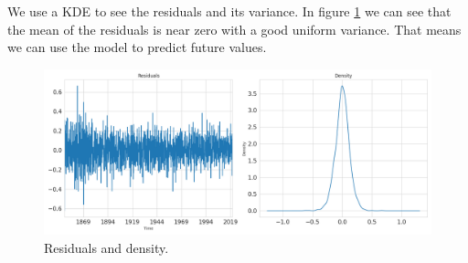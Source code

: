 \documentclass[]{article}
\begin{document}
\begin{itemize}
		We use a KDE to see the residuals and its variance. In figure \ref{fig:res_dens} we can see that the mean of the residuals is near zero with a good uniform variance. That means we can use the model to predict future values.
		\begin{figure}
			\centering
			\includegraphics[width=1\textwidth]{images/res_dens.png}
			\caption{Residuals and density.}
			\label{fig:res_dens}
		\end{figure}
				

\end{itemize}
\end{document}
